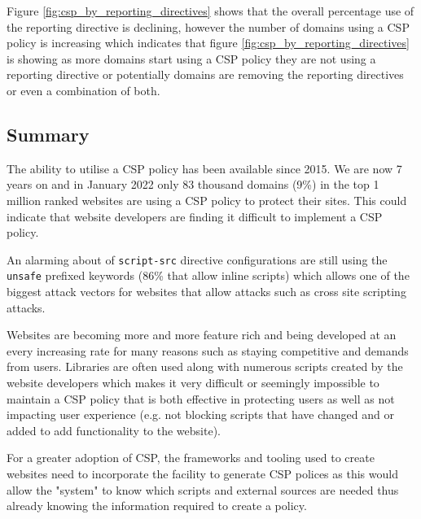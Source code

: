\documentclass{mscreport}
\begin{document}
\vspace{0.3cm} \noindent
Figure \ref{fig:csp_by_reporting_directives} shows that the overall percentage use of the reporting directive is declining, however the number of domains using a CSP policy is increasing which indicates that figure \ref{fig:csp_by_reporting_directives} is showing as more domains start using a CSP policy they are not using a reporting directive or potentially domains are removing the reporting directives or even a combination of both.

\subsection{Summary}

\noindent
The ability to utilise a CSP policy has been available since 2015. We are now 7 years on and in January 2022 only 83 thousand domains (9\%) in the top 1 million ranked websites are using a CSP policy to protect their sites. This could indicate that website developers are finding it difficult to implement a CSP policy.

\vspace{0.3cm} \noindent
An alarming about of \texttt{script-src} directive configurations are still using the \texttt{unsafe} prefixed keywords (86\% that allow inline scripts) which allows one of the biggest attack vectors for websites that allow attacks such as cross site scripting attacks.

\vspace{0.3cm} \noindent
Websites are becoming more and more feature rich and being developed at an every increasing rate for many reasons such as staying competitive and demands from users. Libraries are often used along with numerous scripts created by the website developers which makes it very difficult or seemingly impossible to maintain a CSP policy that is both effective in protecting users as well as not impacting user experience (e.g. not blocking scripts that have changed and or added to add functionality to the website).

\vspace{0.3cm} \noindent
For a greater adoption of CSP, the frameworks and tooling used to create websites need to incorporate the facility to generate CSP polices as this would allow the "system" to know which scripts and external sources are needed thus already knowing the information required to create a policy.

\clearpage
\newpage


\clearpage
\newpage
\end{document}

